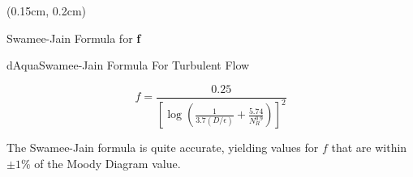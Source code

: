 \documentclass[9pt,xcolor=x11names,professionalfonts, mathserif]{beamer}
\begin{document}

\begin{frame}

	
\end{frame}


\begin{frame}
	\begin{textblock*}{1\columnwidth}(0.15cm, 0.2cm)
	\end{textblock*}
\end{frame}


\begin{frame}{Swamee-Jain Formula for \textbf{f}}

		\begin{cmini}[0.8]{
			\begin{cb}[10]{dAqua}{Swamee-Jain Formula For Turbulent Flow}{
				\par\smallskip
				\[ f = \frac{0.25}{\left[\log\left(\frac{1}{3.7\left(D/\epsilon\right)}+\frac{5.74}{N_R^{0.9}}\right)\right]^2} \]
				\par\smallskip
			}\end{cb}
			\par\bigskip
			The Swamee-Jain formula is quite accurate, yielding values for $f$ that are within $\pm 1\%$ of the Moody Diagram
			value.
		}\end{cmini}
\end{frame}
\end{document}
